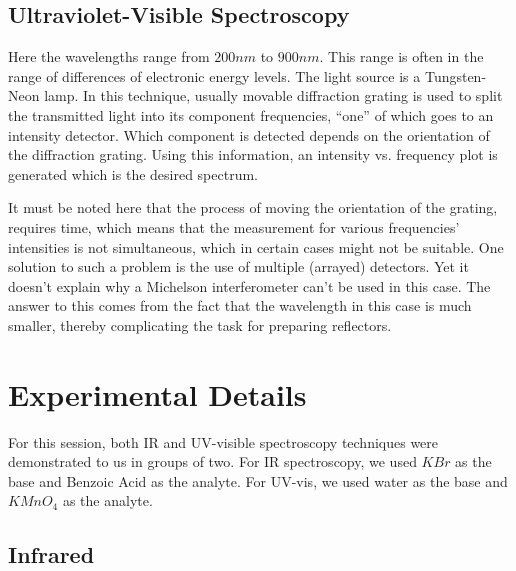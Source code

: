\subsection{Ultraviolet-Visible Spectroscopy}
Here the wavelengths range from $200 nm$ to $900 nm$. This range is often in the range of differences of electronic energy levels. The light source is a Tungsten-Neon lamp. In this technique, usually movable diffraction grating is used to split the transmitted light into its component frequencies, ``one'' of which goes to an intensity detector. Which component is detected depends on the orientation of the diffraction grating. Using this information, an intensity vs. frequency plot is generated which is the desired spectrum.
\par
It must be noted here that the process of moving the orientation of the grating, requires time, which means that the measurement for various frequencies' intensities is not simultaneous, which in certain cases might not be suitable. One solution to such a problem is the use of multiple (arrayed) detectors. Yet it doesn't explain why a Michelson interferometer can't be used in this case.  The answer to this comes from the fact that the wavelength in this case is much smaller, thereby complicating the task for preparing reflectors.

\section{Experimental Details}
For this session, both IR and UV-visible spectroscopy techniques were demonstrated to us in groups of two.
For IR spectroscopy, we used $KBr$ as the base and Benzoic Acid as the analyte. For UV-vis, we used water as the base and $KMnO_{4}$ as the analyte.
\subsection{Infrared}
